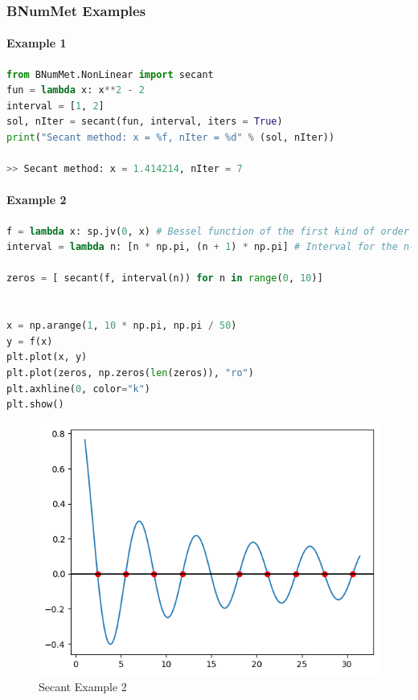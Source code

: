 \subsubsection{BNumMet Examples}
\paragraph{Example 1}{
\begin{lstlisting}[language=Python]
from BNumMet.NonLinear import secant
fun = lambda x: x**2 - 2
interval = [1, 2]
sol, nIter = secant(fun, interval, iters = True)
print("Secant method: x = %f, nIter = %d" % (sol, nIter))

>> Secant method: x = 1.414214, nIter = 7
\end{lstlisting}
}
\paragraph{Example 2}{
\begin{lstlisting}[language=Python]
f = lambda x: sp.jv(0, x) # Bessel function of the first kind of order 0
interval = lambda n: [n * np.pi, (n + 1) * np.pi] # Interval for the n-th zero

zeros = [ secant(f, interval(n)) for n in range(0, 10)]


x = np.arange(1, 10 * np.pi, np.pi / 50)
y = f(x)
plt.plot(x, y)
plt.plot(zeros, np.zeros(len(zeros)), "ro")
plt.axhline(0, color="k")
plt.show()
\end{lstlisting}
\begin{figure}[H]
    \centering
    \includegraphics{Include/Images/Thesis/Documentation/NonLinear/Secant Example 2.png}
    \caption{Secant Example 2}
    \label{fig:Secant Example 2}
\end{figure}
}


